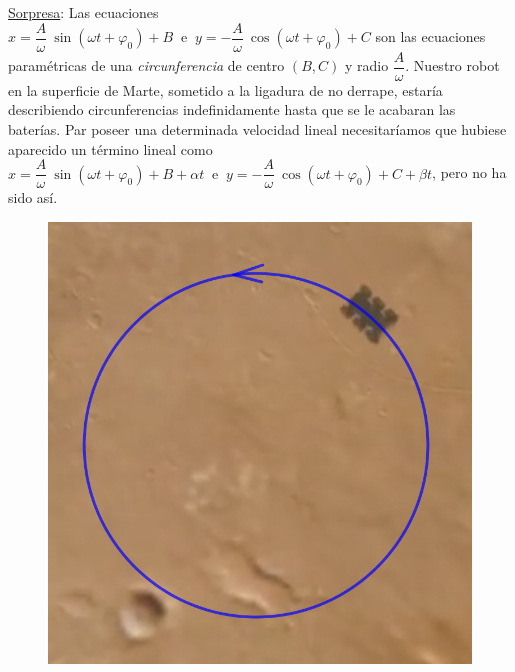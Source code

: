 \begin{example}
\vspace{5mm} 
\begin{multicols}{2}
\underline{Sorpresa}: Las ecuaciones $ x=\dfrac A \omega \ \sin(\omega t + \varphi_0) + B  \ \text{ e } \ 
 y=-\dfrac A \omega \ \cos(\omega t + \varphi_0) + C$ son las ecuaciones paramétricas de una \emph{circunferencia} de centro $(B,C)$ y radio $\dfrac A \omega$. Nuestro robot en la superficie de Marte, sometido a la ligadura de no derrape, estaría describiendo circunferencias indefinidamente hasta que se le acabaran las baterías. Par poseer una determinada velocidad lineal necesitaríamos que hubiese aparecido un término lineal como
 $ x=\dfrac A \omega \ \sin(\omega t + \varphi_0) + B  + \alpha t \ \text{ e } \ 
 y=-\dfrac A \omega \ \cos(\omega t + \varphi_0) + C + \beta t$, pero no ha sido así.
\begin{figure}[H]
		\centering
		\includegraphics[width=.4\textwidth]{imagenes/img09-03.png}
	\end{figure}
\end{multicols}
\end{example}

\vspace{1cm}
\begin{center}
\end{center}
\vspace{1cm}

